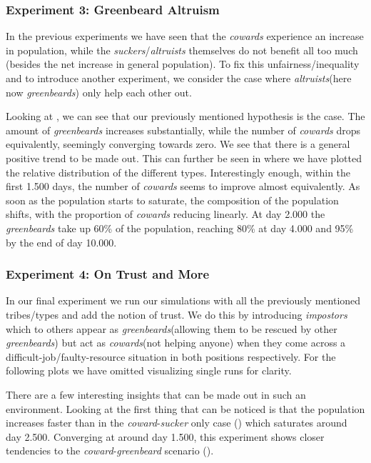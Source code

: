 \documentclass[sigconf]{acmart}
\newcommand{\cowards}{\textit{cowards}\xspace}
\newcommand{\coward}{\textit{coward}\xspace}
\newcommand{\altruists}{\textit{altruists}\xspace}
\newcommand{\suckers}{\textit{suckers}\xspace}
\newcommand{\sucker}{\textit{sucker}\xspace}
\newcommand{\impostors}{\textit{impostors}\xspace}
\newcommand{\greenbeards}{\textit{greenbeards}\xspace}
\newcommand{\greenbeard}{\textit{greenbeard}\xspace}
\begin{document}
    \subsubsection*{Experiment 3: Greenbeard Altruism}
    In the previous experiments we have seen that the \cowards experience an increase in population, while the \suckers/\altruists themselves do not benefit all too much (besides the net increase in general population).
    To fix this unfairness/inequality and to introduce another experiment, we consider the case where \altruists (here now \greenbeards) only help each other out.

    Looking at , we can see that our previously mentioned hypothesis is the case.
    The amount of \greenbeards increases substantially, while the number of \cowards drops equivalently, seemingly converging towards zero.
    We see that there is a general positive trend to be made out.
    This can further be seen in  where we have plotted the relative distribution of the different types.
    Interestingly enough, within the first 1.500 days, the number of \cowards seems to improve almost equivalently.
    As soon as the population starts to saturate, the composition of the population shifts, with the proportion of \cowards reducing linearly.
    At day 2.000 the \greenbeards take up 60\% of the population, reaching 80\% at day 4.000 and 95\% by the end of day 10.000.



    \subsubsection*{Experiment 4: On Trust and More}
    In our final experiment we run our simulations with all the previously mentioned tribes/types and add the notion of trust.
    We do this by introducing \impostors which to others appear as \greenbeards (allowing them to be rescued by other \greenbeards) but act as \cowards (not helping anyone) when they come across a difficult-job/faulty-resource situation in both positions respectively.
    For the following plots we have omitted visualizing single runs for clarity.

    There are a few interesting insights that can be made out in such an environment.
    Looking at  the first thing that can be noticed is that the population increases faster than in the \coward-\sucker only case () which saturates around day 2.500.
    Converging at around day 1.500, this experiment shows closer tendencies to the \coward-\greenbeard scenario ().
\end{document}
